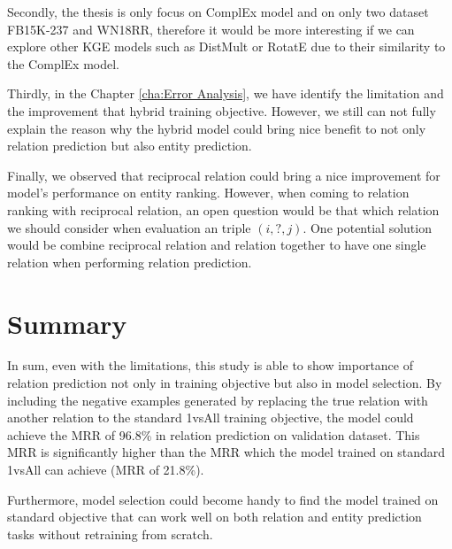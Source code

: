 Secondly, the thesis is only focus on ComplEx model and on only two dataset FB15K-237 and WN18RR, therefore it would be more interesting if we can explore other KGE models such as DistMult \citep{yang2014embedding} or RotatE \citep{sun2019rotate} due to their similarity to the ComplEx model.

Thirdly, in the Chapter \ref{cha:Error Analysis}, we have identify the limitation and the improvement that hybrid training objective. However, we still can not fully explain the reason why the hybrid model could bring nice benefit to not only relation prediction but also entity prediction. 

Finally, we observed that reciprocal relation could bring a nice improvement for model's performance on entity ranking. However, when coming to relation ranking with reciprocal relation, an open question would be that which relation we should consider when evaluation an triple $(i, ?, j)$. One potential solution would be combine reciprocal relation and relation together to have one single relation when performing relation prediction. 


\section{Summary}
In sum, even with the limitations, this study is able to show importance of relation prediction not only in training objective but also in model selection. By including the negative examples generated by replacing the true relation with another relation to the standard 1vsAll training objective, the model could achieve the MRR of 96.8\% in relation prediction on validation dataset. This MRR is significantly higher than the MRR which the model trained on standard 1vsAll can achieve (MRR of 21.8\%).  

Furthermore, model selection could become handy to find the model trained on standard objective that can work well on both relation and entity prediction tasks without retraining from scratch.  
 
